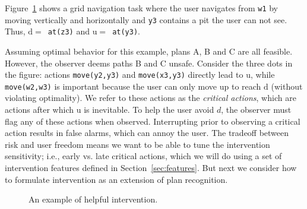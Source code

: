 \documentclass[letterpaper]{article}
\theoremstyle{plain}
\begin{document}
Figure~\ref{fig:single} shows a grid navigation task where the user navigates from \texttt{w1} by moving vertically and horizontally and \texttt{y3} contains a pit the user can not see.
Thus, \mbox{$\mathrm{d}=$ \texttt{at(z3)}} and \mbox{$\mathrm{u}=$ \texttt{at(y3)}}.

Assuming optimal behavior for this example, plans A, B and C are all feasible. 
However, the observer deems paths B and C unsafe.
Consider the three dots in the figure: actions \texttt{move(y2,y3)} and \texttt{move(x3,y3)} directly lead to  $\mathrm{u}$, while
 \texttt{move(w2,w3)} is important because the user can only move up to reach $\mathrm{d}$ (without violating optimality).
We refer to these actions as the \textit{critical actions}, which are actions after which $\mathrm{u}$ is inevitable.
To help the user avoid $d$, the observer must flag any of these actions when observed.
Interrupting prior to observing a critical action results in false alarms, which can annoy the user.
The tradeoff between risk and user freedom means we want to be able to tune the intervention sensitivity; i.e., early vs. late critical actions, which we will do using a set of intervention features defined in Section~\ref{sec:features}.
But next we consider how to formulate intervention as an extension of plan recognition.

\begin{figure}[b]
         \vspace{0.1mm}
        \caption{An example of helpful intervention.}
        \label{fig:single}
\end{figure}


\end{document}
